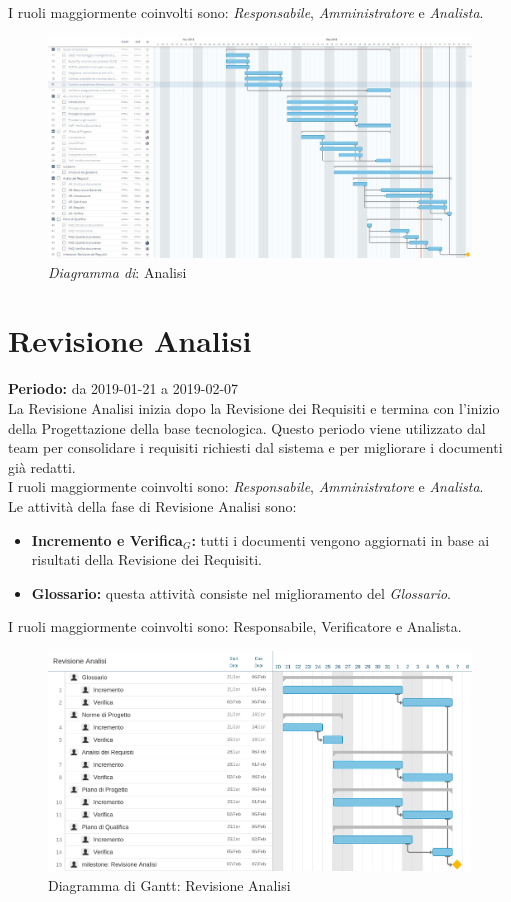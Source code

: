 I ruoli maggiormente coinvolti sono: \textit{Responsabile}, \textit{Amministratore} e \textit{Analista}.
\begin{figure} [h]
    \centering
    \includegraphics[scale=0.3]{./images/analisi.jpg}
    \caption{\textit{Diagramma di}: Analisi }\label{}
\end{figure}
\section{Revisione Analisi}
\textbf{Periodo:} da 2019-01-21 a 2019-02-07\\
La Revisione Analisi inizia dopo la Revisione dei Requisiti e termina con l’inizio della Progettazione della base tecnologica. Questo periodo viene utilizzato dal team per consolidare i requisiti richiesti dal sistema e per migliorare i documenti già redatti.\\I ruoli maggiormente coinvolti sono:  \textit{Responsabile}, \textit{Amministratore} e \textit{Analista}.\\
Le attività della fase di Revisione Analisi sono:
\begin{itemize}
    \item \textbf{Incremento e Verifica$_{G}$:} tutti i documenti vengono aggiornati in base ai risultati della Revisione dei Requisiti.
    \item \textbf{Glossario:} questa attività consiste nel miglioramento del \textit{Glossario}.
\end{itemize}
I ruoli maggiormente coinvolti sono: Responsabile, Verificatore e Analista.
\begin{figure} [h]
    \centering
    \includegraphics[scale=0.2]{./images/revisione_analisi.jpg}
    \caption{Diagramma di Gantt: Revisione Analisi }\label{}
\end{figure}
\newpage
